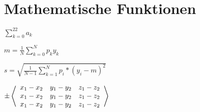 \chapter{Mathematische Funktionen}

$\sum\limits_{k=0}^{22} a_k$

$m = \frac{1}{N} \sum\limits_{k=0}^{N}p_k y_k$

$s= \sqrt{\frac{1}{N-1} \sum\limits_{k=1}^{N}p_i*(y_i-m)^2}$


$ \pm \left\langle 
\begin{array}{c c c}
	x_1-x_2 & y_1 -y_2 & z_1 - z_2 \\
	x_1-x_2 & y_1 -y_2 & z_1 - z_2 \\
	x_1-x_2 & y_1 -y_2 & z_1 - z_2
\end{array}
\right\rangle$